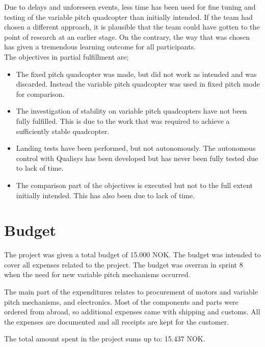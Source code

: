 Due to delays and unforeseen events, less time has been used for fine tuning and testing of the variable pitch quadcopter than initially intended. If the team had chosen a different approach, it is plausible that the team could have gotten to the point of research at an earlier stage. On the contrary, the way that was chosen has given a tremendous learning outcome for all participants.\\

The objectives in partial fulfillment are; 
\begin{itemize}
    \item The fixed pitch quadcopter was made, but did not work as intended and was discarded. Instead the variable pitch quadcopter was used in fixed pitch mode for comparison.
    \item The investigation of stability on variable pitch quadcopters have not been fully fulfilled. This is due to the work that was required to achieve a sufficiently stable quadcopter.
    \item Landing tests have been performed, but not autonomously. The autonomous control with Qualisys has been developed but has never been fully tested due to lack of time.
    \item The comparison part of the objectives is executed but not to the full extent initially intended. This has also been due to lack of time. 
\end{itemize}


\section{Budget}
The project was given a total budget of 15.000 NOK. The budget was intended to cover all expenses related to the project. The budget was overran in sprint 8 when the need for new variable pitch mechanisms occurred.\bigskip

The main part of the expenditures relates to procurement of motors and variable pitch mechanisms, and electronics. Most of the components and parts were ordered from abroad, so additional expenses came with shipping and customs. All the expenses are documented and all receipts are kept for the customer. \bigskip

The total amount spent in the project sums up to: 15.437 NOK.